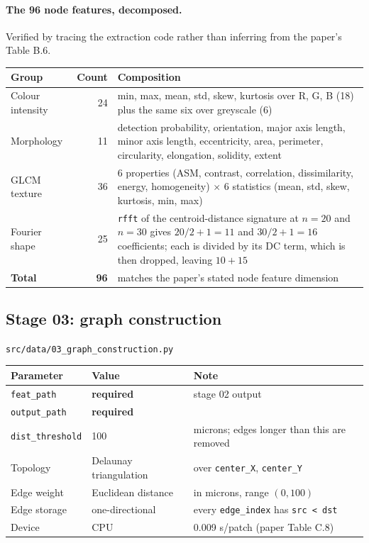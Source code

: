 \documentclass[10pt,a4paper]{article}
\newcommand{\req}{\textcolor{eosin}{\textbf{required}}}
\begin{document}
\paragraph{The 96 node features, decomposed.} Verified by tracing the extraction
code rather than inferring from the paper's Table B.6.

\begin{longtable}{@{}p{3.3cm}r p{11.0cm}@{}}
\toprule
\textbf{Group} & \textbf{Count} & \textbf{Composition} \\
\midrule \endhead
Colour intensity & 24 & min, max, mean, std, skew, kurtosis over R, G, B (18) plus the same six over greyscale (6) \\
Morphology & 11 & detection probability, orientation, major axis length, minor axis length, eccentricity, area, perimeter, circularity, elongation, solidity, extent \\
GLCM texture & 36 & 6 properties (ASM, contrast, correlation, dissimilarity, energy, homogeneity) $\times$ 6 statistics (mean, std, skew, kurtosis, min, max) \\
Fourier shape & 25 & \texttt{rfft} of the centroid-distance signature at $n=20$ and $n=30$ gives $20/2+1=11$ and $30/2+1=16$ coefficients; each is divided by its DC term, which is then dropped, leaving $10 + 15$ \\
\midrule
\textbf{Total} & \textbf{96} & matches the paper's stated node feature dimension \\
\bottomrule
\end{longtable}

\subsection{Stage 03: graph construction}
\noindent\texttt{src/data/03\_graph\_construction.py}

\begin{longtable}{@{}p{4.6cm}p{3.4cm}p{7.6cm}@{}}
\toprule
\textbf{Parameter} & \textbf{Value} & \textbf{Note} \\
\midrule \endhead
\texttt{feat\_path} & \req & stage 02 output \\
\texttt{output\_path} & \req & \\
\texttt{dist\_threshold} & 100 & microns; edges longer than this are removed \\
Topology & Delaunay triangulation & over \texttt{center\_X}, \texttt{center\_Y} \\
Edge weight & Euclidean distance & in microns, range $(0, 100)$ \\
Edge storage & one-directional & every \texttt{edge\_index} has \texttt{src < dst} \\
Device & CPU & 0.009 s/patch (paper Table C.8) \\
\bottomrule
\end{longtable}
\end{document}
